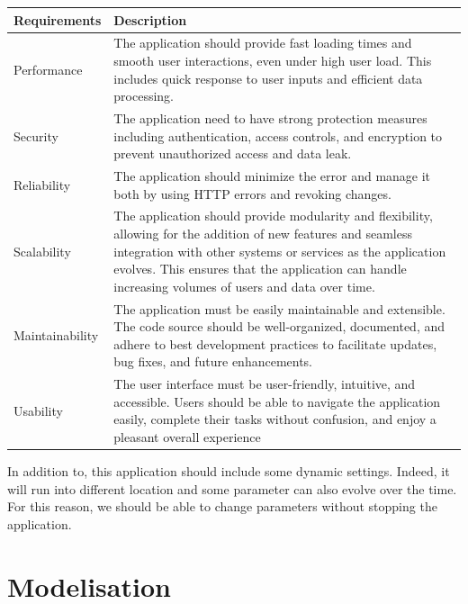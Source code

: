 \documentclass[12pt,a4paper,table,english]{article}
\begin{document}
	
	\begin{center}
		\begin{tabular}{| p{3cm} | p{12cm} |}
			\hline
			Requirements & Description \\\hline
		
			Performance & The application should provide fast loading times and smooth user interactions, even under high user load. This includes quick response to user inputs and efficient data processing. \\\hline
		
			Security & The application need to have strong protection measures including authentication, access controls, and encryption to prevent unauthorized access and data leak. \\\hline
		
			Reliability & The application should minimize the error and manage it both by using HTTP errors and revoking changes. \\\hline
		
			Scalability & The application should provide modularity and flexibility, allowing for the addition of new features and seamless integration with other systems or services as the application evolves. This ensures that the application can handle increasing volumes of users and data over time. \\\hline
		
			Maintainability & The application must be easily maintainable and extensible. The code source should be well-organized, documented, and adhere to best development practices to facilitate updates, bug fixes, and future enhancements. \\\hline
			
			Usability & The user interface must be user-friendly, intuitive, and accessible. Users should be able to navigate the application easily, complete their tasks without confusion, and enjoy a pleasant overall experience \\\hline
		\end{tabular}
	\end{center}
	
	
	In addition to, this application should include some dynamic settings. Indeed, it will run into different location and some parameter can also evolve over the time. For this reason, we should be able to change parameters without stopping the application.
	
	
	\section{Modelisation}
	
\end{document}
